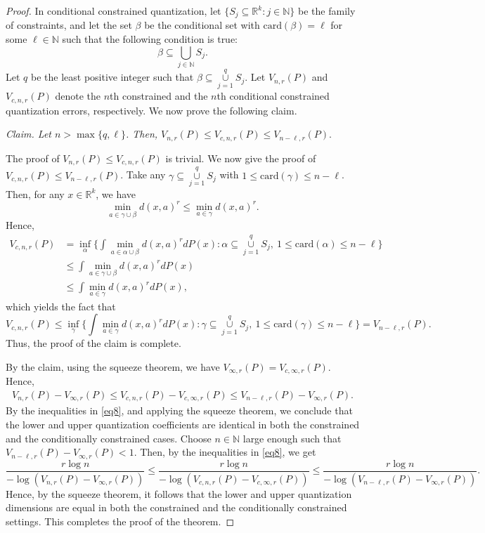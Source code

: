 \documentclass[12pt, reqno]{amsart}
\theoremstyle{plain}
\theoremstyle{definition}
\newcommand{\uu}{\cup}%
\newcommand{\UU}{\bigcup}%
\newcommand{\ci}{\subseteq}%
\newcommand{\set}[1]{\{#1\}}%
\newcommand{\ga}{\alpha}
\newcommand{\gb}{\beta}
\renewcommand{\gg}{\gamma}%
\newcommand{\tit}{\textit}%
\newcommand{\D}[1]{\mathbb{#1}}%
\newcommand{\te}{\text}%
\begin{document}
\begin{proof} 
In conditional constrained quantization, let $\set{S_j\ci \D R^k: j\in \D N}$ be the family of constraints, and let the set $\gb$ be the conditional set with $\te{card}(\gb)=\ell$ for some $\ell\in \D N$ such that the following condition is true: 
\begin{equation*}
\gb \ci \UU_{j\in \D N} S_j.
\end{equation*}
Let $q$ be the least positive integer such that $\gb\ci \mathop{\uu}\limits_{j=1}^q S_j$.  
Let  $ V_{n,r}(P)$ and  $V_{c,n,r}(P)$ denote  the $n$th constrained  and the $n$th conditional constrained quantization  errors, respectively. 
We now prove the following claim.

\tit{Claim.  Let $n> \max \set{q, \ell}$. Then, 
$V_{n,r}(P)\leq V_{c, n,r}(P)\leq V_{n-\ell,r}(P).$}

The proof of $V_{n,r}(P)\leq V_{c, n,r}(P)$ is trivial. We now give the proof of $V_{c, n,r}(P)\leq V_{n-\ell,r}(P)$. 
Take any $\gg\ci \mathop{\uu}\limits_{j=1}^q S_j$ with $1\leq \te{card}(\gg)\leq n-\ell$. Then, for any $x\in \D R^k$, we have 
\[\min_{a\in \gg\uu \gb}d(x, a)^r \leq \min_{a\in \gg} d(x, a)^r.\]
Hence, 
\begin{align*} 
V_{c, n, r}(P)&=\inf_{\ga} \Big\{\int \mathop{\min}\limits_{a\in\ga\uu\gb} d(x, a)^r dP(x) : \ga \ci \mathop{\uu}\limits_{j=1}^q S_j, ~ 1\leq  \text{card}(\ga) \leq n-\ell \Big\}\\
&\leq \int \mathop{\min}\limits_{a\in\gg\uu\gb} d(x, a)^r dP(x)\\
&\leq \int \mathop{\min}\limits_{a\in\gg} d(x, a)^r dP(x),
\end{align*} 
which yields the fact that 
\[V_{c, n, r}(P)\leq \inf_{\gg} \Big\{\int \mathop{\min}\limits_{a\in\gg } d(x, a)^r dP(x) : \gg\ci \mathop{\uu}\limits_{j=1}^q S_j, ~ 1\leq  \text{card}(\gg) \leq n-\ell \Big\}=V_{n-\ell, r}(P).\]
Thus, the proof of the claim is complete. 

By the claim, using the squeeze theorem, we have $V_{\infty, r}(P)=V_{c, \infty, r}(P)$. Hence, 
\begin{align}\label{eq8}
	V_{n,r}(P)-V_{\infty, r}(P)\leq V_{c, n,r}(P)-V_{c, \infty, r}(P) \leq V_{n-\ell,r}(P)-V_{\infty, r}(P).
\end{align}
By the inequalities in \eqref{eq8}, and applying the squeeze theorem, we conclude that the lower and upper quantization coefficients are identical in both the constrained and the conditionally constrained cases. 
 Choose $n\in \mathbb{N}$ large enough such that $V_{n-\ell,r}(P)-V_{\infty, r}(P)<1$. Then, by the inequalities in \eqref{eq8}, we get  
 $$\frac{r\log n}{-\log(V_{n,r}(P)-V_{\infty, r}(P))}\leq \frac{r\log n}{-\log(V_{c, n,r}(P)-V_{c, \infty, r}(P))}\leq \frac{r\log n}{-\log(V_{n-\ell,r}(P)-V_{\infty, r}(P))}.$$
Hence, by the squeeze theorem, it follows that the lower and upper quantization dimensions are equal in both the constrained and the conditionally constrained settings. This completes the proof of the theorem.
\end{proof} 
\end{document}
